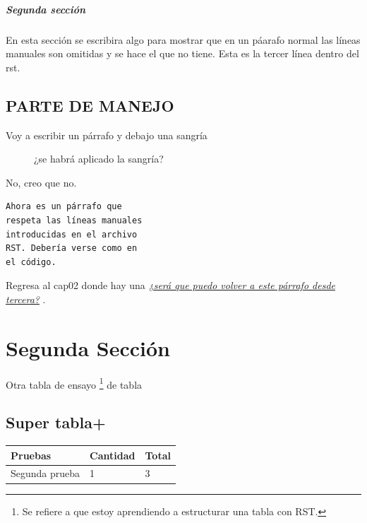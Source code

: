 \documentclass[letterpaper,10pt,french]{sphinxmanual}
\begin{document}
\subsubsection{Segunda sección}
\label{cap01:segunda}\label{cap01:segunda-seccion}
En esta sección se escribira algo
para mostrar que en un páarafo normal las líneas manuales son omitidas y se hace el que no tiene.
Esta es la tercer línea dentro del rst.


\chapter{PARTE DE MANEJO}
\label{cap01:tercera}\label{cap01:parte-de-manejo}\begin{description}
\item[{Voy a escribir un párrafo y debajo una sangría}] \leavevmode
¿se habrá aplicado la sangría?

\end{description}

No, creo que no.

\begin{Verbatim}[commandchars=\\\{\}]
Ahora es un párrafo que
respeta las líneas manuales
introducidas en el archivo
RST. Debería verse como en
el código.
\end{Verbatim}

Regresa al cap02 donde hay una {\hyperref[cap02:pregunta]{\emph{¿será que puedo volver a este párrafo desde tercera?}}} .


\part{Segunda Sección}
\label{cap02:segunda-seccion}\label{cap02::doc}
Otra tabla de ensayo \footnote[1]{
Se refiere a que estoy aprendiendo a estructurar una tabla con RST.
} de tabla


\chapter{\textbf{Super tabla+}}
\label{cap02:sueldo}\label{cap02:super-tabla}
\begin{tabulary}{\linewidth}{|L|L|L|}
\hline
\textsf{\relax 
Pruebas
} & \textsf{\relax 
Cantidad \protect\footnotemark[2]
} & \textsf{\relax 
Total
}\\
\hline
Segunda prueba
 & 
1
 & 
3
\\
\hline\end{tabulary}
\end{document}
